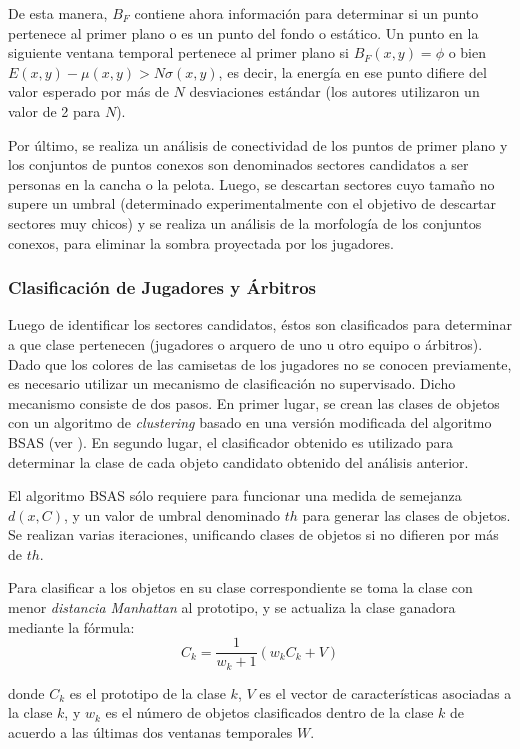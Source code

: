 De esta manera, $B_F$ contiene ahora información para determinar si un punto
pertenece al primer plano o es un punto del fondo o estático. Un punto en la
siguiente ventana temporal pertenece al primer plano si $B_F(x, y) = \phi$ o
bien $E(x, y) - \mu(x, y) > N \sigma(x, y)$, es decir, la energía en ese punto
difiere del valor esperado por más de $N$ desviaciones estándar (los autores
utilizaron un valor de 2 para $N$).

Por último, se realiza un análisis de conectividad de los puntos de primer
plano y los conjuntos de puntos conexos son denominados sectores candidatos
a ser personas en la cancha o la pelota. Luego, se descartan sectores
cuyo tamaño no supere un umbral (determinado experimentalmente con el
objetivo de descartar sectores muy chicos) y se realiza un análisis de la
morfología de los conjuntos conexos, para eliminar la sombra proyectada por los
jugadores.

\subsubsection{Clasificación de Jugadores y Árbitros}

Luego de identificar los sectores candidatos, éstos son clasificados para
determinar a que clase pertenecen (jugadores o arquero de uno u otro equipo
o árbitros). Dado que los colores de las camisetas de
los jugadores no se conocen previamente, es necesario utilizar un mecanismo
de clasificación no supervisado. Dicho mecanismo consiste de dos pasos. En
primer lugar, se crean las clases de objetos con un algoritmo de
\textit{clustering} basado en una versión modificada del algoritmo BSAS
(ver \cite{BSAS}). En segundo lugar, el clasificador obtenido es utilizado
para determinar la clase de cada objeto candidato obtenido del análisis anterior.

El algoritmo BSAS sólo requiere para funcionar una medida de semejanza $d(x, C)$,
y un valor de umbral denominado $th$ para generar las clases de objetos.
Se realizan varias iteraciones, unificando clases de objetos si no difieren
por más de $th$.

Para clasificar a los objetos en su clase correspondiente se toma la clase con
menor \textit{distancia Manhattan} al prototipo, y se actualiza la clase
ganadora mediante la fórmula:
\[
  C_k = \frac{1}{w_k+1}(w_k C_k + V)
\]

donde $C_k$ es el prototipo de la clase $k$, $V$ es el vector de
características asociadas a la clase $k$, y $w_k$ es el número de
objetos clasificados dentro de la clase $k$ de acuerdo a las últimas dos
ventanas temporales $W$.

